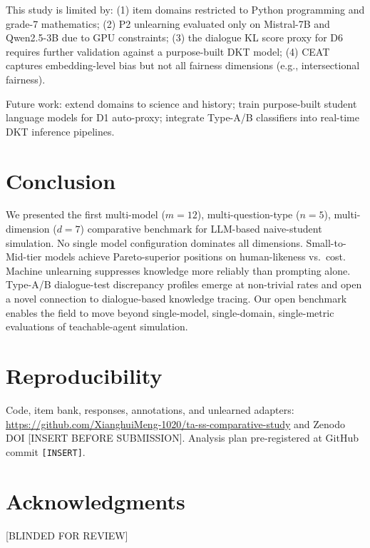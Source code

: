 \documentclass[10pt,twocolumn]{IEEEtran}
\begin{document}
This study is limited by: (1) item domains restricted to Python programming and
grade-7 mathematics; (2) P2 unlearning evaluated only on Mistral-7B and Qwen2.5-3B
due to GPU constraints; (3) the dialogue KL score proxy for D6 requires further
validation against a purpose-built DKT model; (4) CEAT captures embedding-level
bias but not all fairness dimensions (e.g., intersectional fairness).

Future work: extend domains to science and history; train purpose-built student
language models for D1 auto-proxy; integrate Type-A/B classifiers into real-time
DKT inference pipelines.

\section{Conclusion}

We presented the first multi-model ($m=12$), multi-question-type ($n=5$),
multi-dimension ($d=7$) comparative benchmark for LLM-based naive-student simulation.
No single model configuration dominates all dimensions.
Small-to-Mid-tier models achieve Pareto-superior positions on human-likeness vs.\
cost. Machine unlearning suppresses knowledge more reliably than prompting alone.
Type-A/B dialogue-test discrepancy profiles emerge at non-trivial rates and open
a novel connection to dialogue-based knowledge tracing.
Our open benchmark enables the field to move beyond single-model, single-domain,
single-metric evaluations of teachable-agent simulation.

\section*{Reproducibility}
Code, item bank, responses, annotations, and unlearned adapters:
\url{https://github.com/XianghuiMeng-1020/ta-ss-comparative-study} and Zenodo
DOI [INSERT BEFORE SUBMISSION]. Analysis plan pre-registered at GitHub commit
\texttt{[INSERT]}.

\section*{Acknowledgments}
[BLINDED FOR REVIEW]



\end{document}
